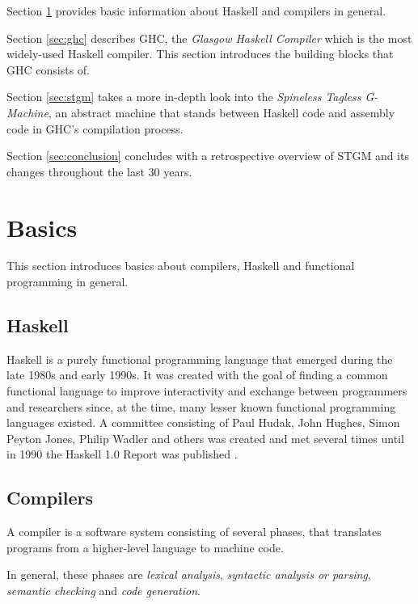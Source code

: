 \documentclass[runningheads]{llncs}
\begin{document}
Section \ref{sec:basics} provides basic information about Haskell and compilers in general.

Section \ref{sec:ghc} describes GHC, the \textit{Glasgow Haskell Compiler} which is the most widely-used Haskell compiler. This section introduces the building blocks that GHC consists of.

Section \ref{sec:stgm} takes a more in-depth look into the \textit{Spineless Tagless G-Machine}, an abstract machine that stands between Haskell code and assembly code in GHC's compilation process.

Section \ref{sec:conclusion} concludes with a retrospective overview of STGM and its changes throughout the last 30 years.


\newpage
\section{Basics}
\label{sec:basics}

This section introduces basics about compilers, Haskell and functional programming in general.

\subsection{Haskell}
Haskell is a purely functional programming language that emerged during the late 1980s and early 1990s. It was created with the goal of finding a common functional language to improve interactivity and exchange between programmers and researchers since, at the time, many lesser known functional programming languages existed. A committee consisting of Paul Hudak, John Hughes, Simon Peyton Jones, Philip Wadler and others was created and met several times until in 1990 the Haskell 1.0 Report was published \cite{hudak2007history}.

\subsection{Compilers}
A compiler is a software system consisting of several phases, that translates programs from a higher-level language to machine code. \cite{muchnick1997advanced}

In general, these phases are \textit{lexical analysis}, \textit{syntactic analysis or parsing}, \textit{semantic checking} and \textit{code generation}. \cite{muchnick1997advanced}
\end{document}
